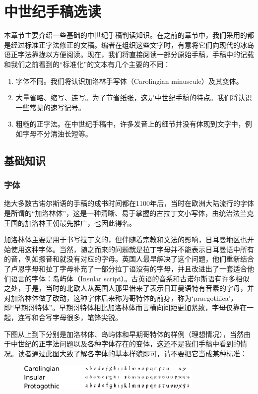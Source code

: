 \chapter{中世纪手稿选读}
本章节主要介绍一些基础的中世纪手稿判读知识。在之前的章节中，我们采用的都是经过标准正字法修正的文稿。编者在组织这些文字时，有意将它们向现代的冰岛语正字法靠拢以方便阅读。现在，我们将直接阅读一部分原始手稿，手稿中的记载和我们之前看到的“标准化”的文本有几个主要的不同：
\begin{enumerate}
    \item 字体不同。我们将认识加洛林手写体（Carolingian minuscule）及其变体。

    \item 大量省略、缩写、连写。为了节省纸张，这是中世纪手稿的特点。我们将认识一些常见的速写记号。

    \item 粗糙的正字法。在中世纪手稿中，许多发音上的细节并没有体现到文字中，例如字母不分清浊长短等。
\end{enumerate}

\section{基础知识}
\subsection{字体}
绝大多数古诺尔斯语的手稿的成书时间都在1100年后，当时在欧洲大陆流行的字体是所谓的“加洛林体”，这是一种清晰、易于掌握的古拉丁文小写体，由统治法兰克王国的加洛林王朝最先推广，也因此得名。

加洛林体主要是用于书写拉丁文的，但伴随着宗教和文法的影响，日耳曼地区也开始使用这种字体。当然，随之而来的问题就是拉丁字母并不能表示日耳曼语中所有的音，例如擦音\th 和\dh 就没有对应的字母。英国人最早解决了这个问题，他们重新结合了卢恩字母和拉丁字母补充了一部分拉丁语没有的字母，并且改进出了一套适合他们语言的字体：岛屿体（Insular script）。古英语的音系和古诺尔斯语有许多相似之处，于是，当时的北欧人从英国人那里借来了表示日耳曼语特有音素的字母，并对加洛林体做了改动，这种字体后来称为哥特体的前身，称为`praegothica'，即“早期哥特体”。早期哥特体相比加洛林体而言横向间距更加紧致，字母仅靠在一起，连写和合写字母很多，笔锋尖锐。

下图从上到下分别是加洛林体、岛屿体和早期哥特体的样例（理想情况），当然由于中世纪的正字法问题以及各种字体存在的变体，这还不是我们手稿中看到的情况。读者通过此图大致了解各字体的基本样貌即可，请不要把它当成某种标准：
\begin{figure}[htbp]
    \centering
    \includegraphics[width=0.8\textwidth]{figure/script.png}
\end{figure}

